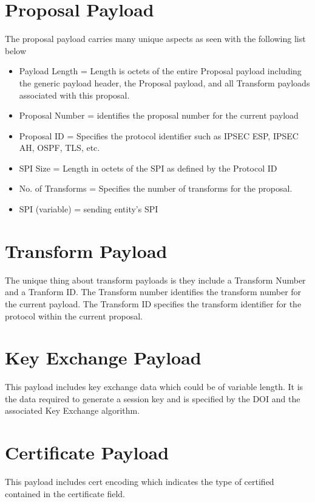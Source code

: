 \documentclass{report}
\begin{document}
\section {Proposal Payload}

The proposal payload carries many unique aspects as seen with the following list below

\begin{itemize}
\item Payload Length = Length is octets of the entire Proposal payload including the generic payload header, the Proposal payload, and all Transform payloads associated with this proposal.
\item Proposal Number = identifies the proposal number for the current payload
\item Proposal ID = Specifies the protocol identifier such as IPSEC ESP, IPSEC AH, OSPF, TLS, etc.
\item SPI Size = Length in octets of the SPI as defined by the Protocol ID
\item No. of Transforms = Specifies the number of transforms for the proposal.
\item SPI (variable) = sending entity's SPI
\end{itemize}

\section {Transform Payload}

The unique thing about transform payloads is they include a Transform Number and a Tranform ID. The Transform number identifies the transform number for the current payload. The Transform ID specifies the transform identifier for the protocol within the current proposal. 

\section {Key Exchange Payload}

This payload includes key exchange data which could be of variable length. It is the data required to generate a session key and is specified by the DOI and the associated Key Exchange algorithm.

\section {Certificate Payload}

This payload includes cert encoding which indicates the type of certified contained in the certificate field. 
\end{document}
